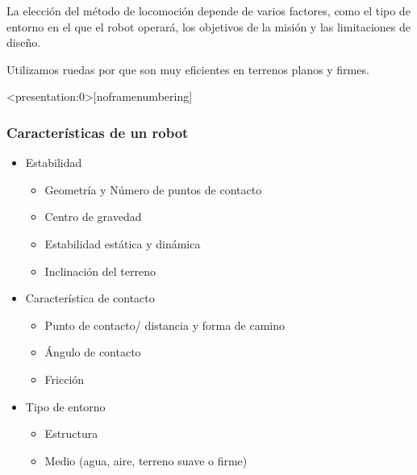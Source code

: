 \begin{frame}
    La elección del método de locomoción depende de varios factores, como el tipo de entorno en el que el robot operará, los objetivos de la misión y las limitaciones de diseño. 

    Utilizamos ruedas por que son muy eficientes en terrenos planos y firmes.
\end{frame}



\begin{frame}<presentation:0>[noframenumbering]
	\frametitle{Características de un robot}
	
	\begin{itemize}
		\item Estabilidad
		\begin{itemize}
			\item Geometría y Número de puntos de contacto
			\item Centro de gravedad
			\item Estabilidad estática y dinámica
			\item Inclinación del terreno
		\end{itemize}
		\item Característica de contacto
		\begin{itemize}
			\item Punto de contacto/ distancia y forma de camino
			\item Ángulo de contacto
			\item Fricción
		\end{itemize}
		\item Tipo de entorno
		\begin{itemize}
			\item Estructura
			\item Medio (agua, aire, terreno suave o firme)
		\end{itemize}
	\end{itemize}
\end{frame}


